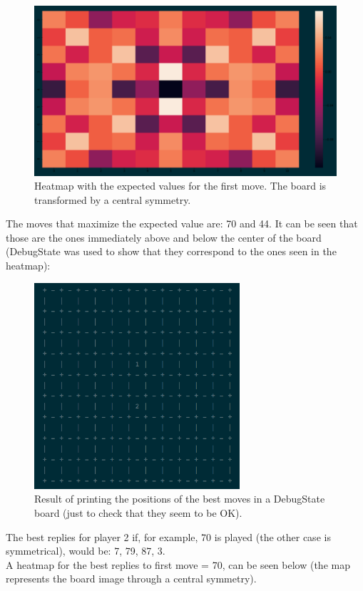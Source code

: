 \documentclass[a4paper,12pt]{article}
\begin{document}
\pagebreak
\begin{figure}[!h]
\centering
\includegraphics[width=5.0in]{first_move.png}
\caption{Heatmap with the expected values for the first move. The board is transformed by a central symmetry.}
\end{figure}

The moves that maximize the expected value are: 70 and 44. It can be seen that those are the ones immediately above and below the center of the board (DebugState was used to show that they correspond to the ones seen in the heatmap):

\begin{figure}[!h]
\centering
\includegraphics[width=3.0in]{best_first.png}
\caption{Result of printing the positions of the best moves in a DebugState board (just to check that they seem to be OK).}
\end{figure}

The best replies for player 2 if, for example, 70 is played (the other case is symmetrical), would be: 7, 79, 87, 3.\\
A heatmap for the best replies to first move = 70, can be seen below (the map represents the board image through a central symmetry).
\end{document}
